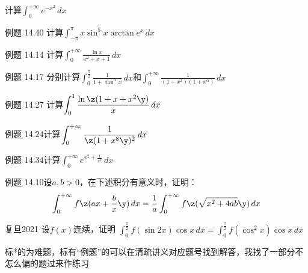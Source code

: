 \begin{problemset}
\item 计算$\displaystyle \int_{0}^{+\infty}e^{-x^2} \,dx $\vspace{2mm}
\item \textcolor{myblue}{例题 14.40} 计算$\displaystyle \int_{-\pi}^{\pi} x\sin^5x\arctan e^x\,dx $\vspace{2mm}
\item \textcolor{myblue}{例题 14.14} 计算$\displaystyle \int_{0}^{+\infty} \frac{\ln x}{x^2+x+1}\,dx  $   \vspace{2mm}
\item \textcolor{myblue}{例题 14.17} 分别计算$\displaystyle \int_{0}^{\frac{\pi}{2}}\frac{1}{1+\tan^{\alpha}x}\,dx$和$\displaystyle \int_{0}^{+\infty} \frac{1}{(1+x^2)(1+x^{\alpha})}\,dx $\vspace{2mm}
\item \textcolor{myblue}{例题 14.27} 计算$ \displaystyle\int_{0}^{1}\frac{\ln\z(1+x+x^2\y)}{x}\,dx $\vspace{2mm}
\item *\textcolor{myblue}{例题 14.24}计算$\displaystyle \int_{0}^{+\infty} \frac{1}{\z( 1+x^8\y)^2}\,dx $\vspace{2mm}
\item *\textcolor{myblue}{例题 14.34}计算$\displaystyle \int_{0}^{+\infty} e^{x^2+\frac{1}{x^2}} \,dx $ \vspace{2mm}
\item *\textcolor{myblue}{例题 14.10}设$a,b>0 $，在下述积分有意义时，证明：
        \[ \int_{0}^{+\infty}f\z( ax+\frac{b}{x}\y) \,dx
        =\frac{1}{a} \int_{0}^{+\infty} f\z(\sqrt{x^2+4ab}\y)\,dx \]
        \vspace{2mm}
\item *\textcolor{myblue}{复旦2021} 设$f(x)$连续，证明
    $\displaystyle \int_{0}^  {\frac{\pi}{2}}f(\sin2x)\cos x\,dx
    = \int_{0}^{\frac{\pi}{2}}f(\cos^2x)\cos x\,dx $
    \vspace{2mm}
\end{problemset}
标*的为难题，标有“例题”的可以在清疏讲义对应题号找到解答，我找了一部分不怎么偏的题过来作练习
